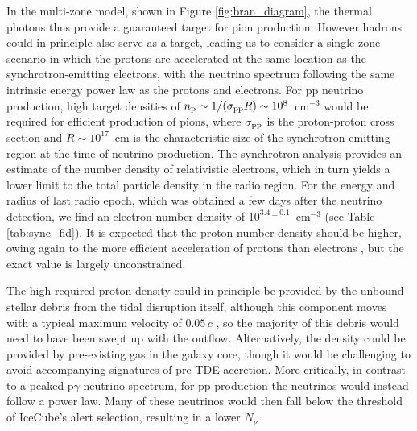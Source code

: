 In the multi-zone model, shown in Figure \ref{fig:bran_diagram}, the thermal photons thus provide a guaranteed target for pion production. However hadrons could in principle also serve as a target, leading us to consider a single-zone scenario in which the protons are accelerated at the same location as the synchrotron-emitting electrons, with the neutrino spectrum following the same intrinsic energy power law as the protons and electrons. For pp neutrino production, high target densities of $n_{\textup{p}}\sim 1/(\sigma_{\textup{pp}} R)\sim 10^8$~cm$^{-3}$ would be required for efficient production of pions, where $\sigma_{\textup{pp}}$ is the proton-proton cross section and $R \sim 10^{17}$~cm is the characteristic size of the synchrotron-emitting region at the time of neutrino production. The synchrotron analysis provides an estimate of the number density of relativistic electrons, which in turn yields a lower limit to the total particle density in the radio region. For the energy and radius of last radio epoch, which was obtained a few days after the neutrino detection, we find an electron number density of $10^{3.4\pm 0.1}$~cm$^{-3}$ (see Table \ref{tab:sync_fid}). It is expected that the proton number density should be higher, owing again to the more efficient acceleration of protons than electrons \cite{2012A&A...538A..81M},  but the exact value is largely unconstrained.

The high required proton density could in principle be provided by the unbound stellar debris from the tidal disruption itself, although this component moves with a typical maximum velocity of $0.05\,c$ , so the majority of this debris would need to have been swept up with the outflow. Alternatively, the density could be provided by pre-existing gas in the galaxy core, though it would be challenging to avoid accompanying signatures of pre-TDE accretion. More critically, in contrast to a peaked p$\gamma$ neutrino spectrum, for pp production the neutrinos would instead follow a power law. Many of these neutrinos would then fall below the threshold of IceCube's alert selection, resulting in a lower $N_{\nu}$

